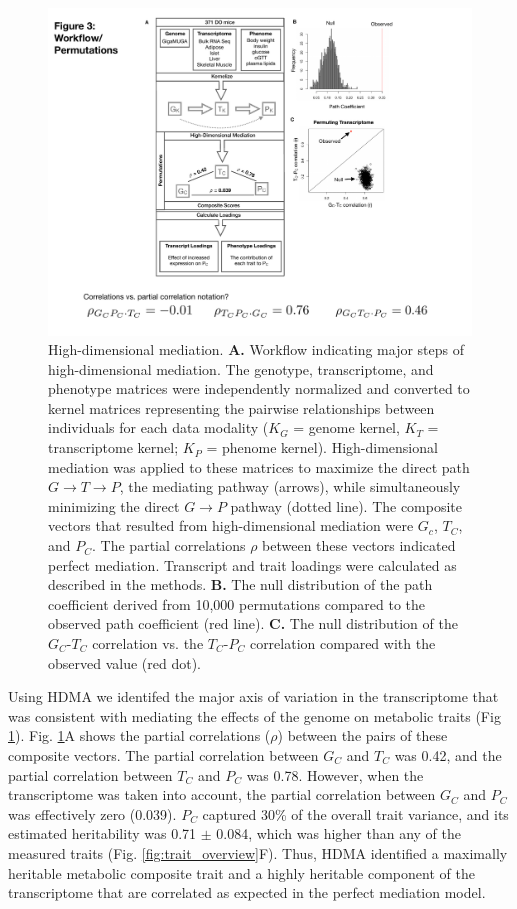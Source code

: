 \documentclass[
]{article}
\begin{document}
\begin{figure}[ht!]
\includegraphics[width=5in]{Figures/Fig3_workflow.pdf} 
\caption{High-dimensional mediation. \textbf{A.} Workflow indicating 
major steps of high-dimensional mediation. The genotype, transcriptome, 
and phenotype matrices were independently normalized and converted to 
kernel matrices representing the pairwise relationships between 
individuals for each data modality ($K_G$ = genome kernel, $K_T$ = 
transcriptome kernel; $K_P$ = phenome kernel). 
High-dimensional mediation was applied to these matrices to maximize the 
direct path $G \rightarrow T \rightarrow P$, the mediating pathway (arrows), 
while simultaneously minimizing the direct $G \rightarrow P$ pathway (dotted 
line). The composite vectors that resulted from high-dimensional mediation were 
$G_c$, $T_C$, and $P_C$. The partial correlations $\rho$ between these vectors 
indicated perfect mediation. Transcript and trait loadings were calculated 
as described in the methods. \textbf{B.} The null distribution of the path 
coefficient derived from 10,000 permutations compared to the observed path 
coefficient (red line). \textbf{C.} The null distribution of the $G_C$-$T_C$ 
correlation vs. the $T_C$-$P_C$ correlation compared with the observed value 
(red dot).
}
\label{fig:workflow}
\end{figure}

Using HDMA we identifed the major axis of variation in the transcriptome
that was consistent with mediating the effects of the genome on
metabolic traits (Fig \ref{fig:workflow}). Fig. \ref{fig:workflow}A
shows the partial correlations (\(\rho\)) between the pairs of these
composite vectors. The partial correlation between \(G_C\) and \(T_C\)
was 0.42, and the partial correlation between \(T_C\) and \(P_C\) was
0.78. However, when the transcriptome was taken into account, the
partial correlation between \(G_C\) and \(P_C\) was effectively zero
(0.039). \(P_C\) captured 30\% of the overall trait variance, and its
estimated heritability was 0.71 \(\pm\) 0.084, which was higher than any
of the measured traits (Fig. \ref{fig:trait_overview}F). Thus, HDMA
identified a maximally heritable metabolic composite trait and a highly
heritable component of the transcriptome that are correlated as expected
in the perfect mediation model.
\end{document}

